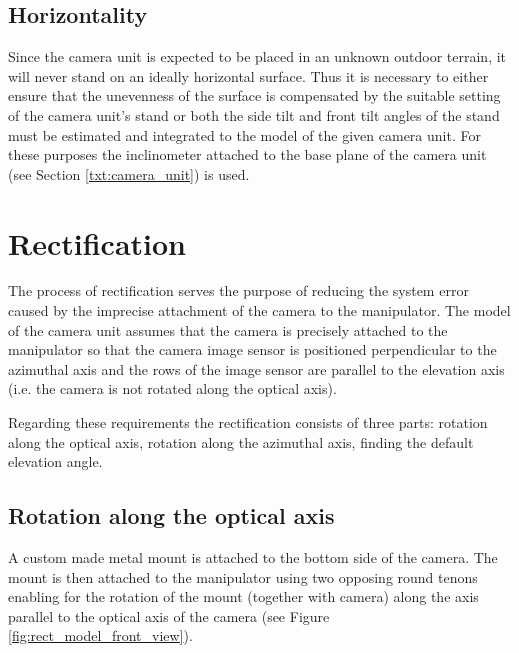 \subsection{Horizontality}
Since the camera unit is expected to be placed in an unknown outdoor terrain, it will never stand on an ideally horizontal surface. Thus it is necessary to either ensure that the unevenness of the surface is compensated by the suitable setting of the camera unit's stand or both the side tilt and front tilt angles of the stand must be estimated and integrated to the model of the given camera unit. For these purposes the inclinometer attached to the base plane of the camera unit (see Section \ref{txt:camera_unit}) is used.


\section{Rectification}

The process of rectification serves the purpose of reducing the system error caused by the imprecise attachment of the camera to the manipulator. The model of the camera unit assumes that the camera is precisely attached to the manipulator so that the camera image sensor is positioned perpendicular to the azimuthal axis and the rows of the image sensor are parallel to the elevation axis (i.e. the camera is not rotated along the optical axis).

Regarding these requirements the rectification consists of three parts: rotation along the optical axis, rotation along the azimuthal axis, finding the default elevation angle.


\subsection{Rotation along the optical axis}

A custom made metal mount is attached to the bottom side of the camera. The mount is then attached to the manipulator using two opposing round tenons enabling for the rotation of the mount (together with camera) along the axis parallel to the optical axis of the camera (see Figure \ref{fig:rect_model_front_view}).

